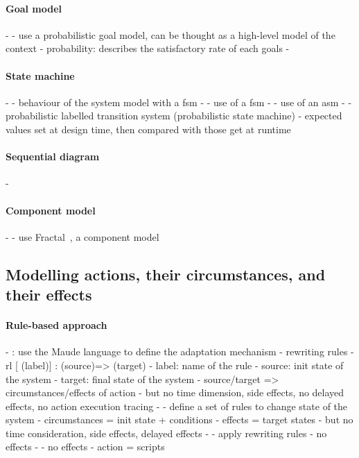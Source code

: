\paragraph{Goal model} %
- \cite{DBLP:conf/icse/CailliauL17}
	- use a probabilistic goal model, can be thought as a high-level model of the context
		- probability: describes the satisfactory rate of each goals
- \cite{DBLP:conf/icse/IftikharW14a, DBLP:conf/icse/MendoncaAR14, DBLP:conf/icse/ChenPYNZ14}

\paragraph{State machine} %
- \cite{DBLP:conf/smartgridsec/0001FKNT14}
	- behaviour of the system model with a \gls{fsm}
- \cite{DBLP:conf/icse/IftikharW14a}
	- use of a \gls{fsm}
- \cite{DBLP:conf/icse/ArcainiRS15}
	- use of an \gls{asm}
- \cite{DBLP:conf/icse/BarbosaLMJ17}
	- probabilistic labelled transition system (probabilistic state machine) 
		- expected values set at design time, then compared with those get at runtime

\paragraph{Sequential diagram}
- \cite{DBLP:conf/icse/TaharaOH17}

	
\paragraph{Component model} %
- \cite{DBLP:conf/soco/DavidL06}
	- use Fractal~\cite{DBLP:conf/cbse/BrunetonCLQS04}, a component model
	
	
	
	
	
	
	
	
	
\subsection[Modelling actions, their circumstances, and their effects]{Modelling \glspl{action}, their \glspl{circumstance}, and their effects}

\paragraph{Rule-based approach}
- \cite{DBLP:conf/icse/TaharaOH17}: use the Maude language to define the adaptation mechanism
	- rewriting rules
	- rl [ (label)] : (source)=> (target)
		- label: name of the rule
		- source: init state of the system
		- target: final state of the system
	- source/target => circumstances/effects of action
	 - but no time dimension, side effects, no delayed effects, no action execution tracing
- \cite{DBLP:conf/icse/ArcainiRS15}
	- define a set of rules to change state of the system
	- circumstances = init state + conditions
	- effects = target states
		- but no time consideration, side effects, delayed effects
- \cite{DBLP:conf/wrla/BruniCGLV12}
	- apply rewriting rules
	- no effects 
- \cite{DBLP:conf/eurosys/GraceHPBCT08}
	- no effects
	- action = scripts
		
